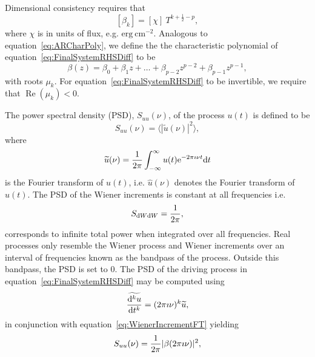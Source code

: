 \documentclass[a4paper,fleqn,usenatbib]{mnras}
\begin{document}
Dimensional consistency requires that 
\begin{equation}\label{eq:MAUnits}
[\beta_{k}] = [\chi]~T^{k+\frac{1}{2}-p},
\end{equation}
where $\chi$ is in units of flux, e.g. $\mathrm{erg}~\mathrm{cm}^{-2}$. Analogous to equation~\eqref{eq:ARCharPoly}, we define the the characteristic polynomial of equation~\eqref{eq:FinalSystemRHSDiff} to be
\begin{equation}\label{eq:MACharPoly}
\beta(z) = \beta_{0} + \beta_{1} z + \ldots + \beta_{p-2} z^{p-2} + \beta_{p-1} z^{p-1},
\end{equation}
with roots $\mu_{k}$. For equation~\eqref{eq:FinalSystemRHSDiff} to be invertible, we require that $\operatorname{Re}(\mu_{k}) < 0$.

The power spectral density (PSD), $S_{uu}(\nu)$, of the process $u(t)$ is defined to be
\begin{equation}\label{eq:PSD}
S_{uu}(\nu) = \langle |\widetilde{u}(\nu)|^{2} \rangle,
\end{equation}
where 
\begin{equation}\label{eq:FT}
\widetilde{u}(\nu) = \frac{1}{2\pi} \int_{-\infty}^{\infty}u(t)\mathrm{e}^{-2\pi \imath \nu t}\mathrm{d}t
\end{equation}
is the Fourier transform of $u(t)$, i.e. $\widehat{u}(\nu)$ denotes the Fourier transform of $u(t)$. The PSD of the Wiener increments is constant at all frequencies \citep{HandbookOfStatistics19Brockwell} i.e.
\begin{equation}\label{eq:WienerIncrementFT}
S_{\mathrm{d}W\mathrm{d}W} = \frac{1}{2 \pi},
\end{equation}
corresponds to infinite total power when integrated over all frequencies. Real processes only resemble the Wiener process and Wiener increments over an interval of frequencies known as the bandpass of the process. Outside this bandpass, the PSD is set to $0$. The PSD of the driving process in equation~\eqref{eq:FinalSystemRHSDiff} may be computed using 
\begin{equation}\label{eq:FTDerivative}
\widetilde{\frac{\mathrm{d}^{k}u}{\mathrm{d}t^{k}}} = (2 \pi \imath \nu)^{k}\widetilde{u},
\end{equation}
in conjunction with equation~\eqref{eq:WienerIncrementFT} yielding
\begin{equation}\label{eq:RHSPSD}
S_{uu}(\nu) = \frac{1}{2 \pi } |\beta(2 \pi \imath \nu)|^{2},
\end{equation}
\end{document}
